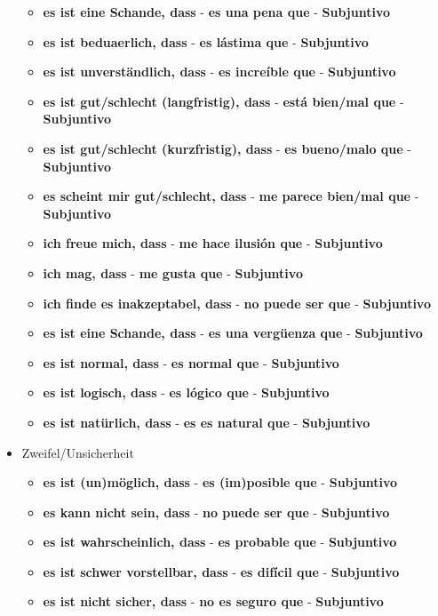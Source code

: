 \documentclass{article}
\begin{document}
\begin{multicols}{2}
\begin{itemize}
		\begin{itemize}
			\item{\textbf{es ist eine Schande, dass} - \textbf{es una pena que} - \textbf{Subjuntivo}}
			\item{\textbf{es ist beduaerlich, dass} - \textbf{es lástima que} - \textbf{Subjuntivo}}
			\item{\textbf{es ist unverständlich, dass} - \textbf{es increíble que} - \textbf{Subjuntivo}}
			\item{\textbf{es ist gut/schlecht (langfristig), dass} - \textbf{está bien/mal que} - \textbf{Subjuntivo}}
			\item{\textbf{es ist gut/schlecht (kurzfristig), dass} - \textbf{es bueno/malo que} - \textbf{Subjuntivo}}
			\item{\textbf{es scheint mir gut/schlecht, dass} - \textbf{me parece bien/mal que} - \textbf{Subjuntivo}}
			\item{\textbf{ich freue mich, dass} - \textbf{me hace ilusión que} - \textbf{Subjuntivo}}
			\item{\textbf{ich mag, dass} - \textbf{me gusta que} - \textbf{Subjuntivo}}
			\item{\textbf{ich finde es inakzeptabel, dass} - \textbf{no puede ser que} - \textbf{Subjuntivo}}
			\item{\textbf{es ist eine Schande, dass} - \textbf{es una vergüenza que} - \textbf{Subjuntivo}}
			\item{\textbf{es ist normal, dass} - \textbf{es normal que} - \textbf{Subjuntivo}}
			\item{\textbf{es ist logisch, dass} - \textbf{es lógico que} - \textbf{Subjuntivo}}
			\item{\textbf{es ist natürlich, dass} - \textbf{es es natural que} - \textbf{Subjuntivo}}
		\end{itemize}
		\item{Zweifel/Unsicherheit}
		\begin{itemize}
			\item{\textbf{es ist (un)möglich, dass} - \textbf{es (im)posible que} - \textbf{Subjuntivo}}
			\item{\textbf{es kann nicht sein, dass} - \textbf{no puede ser que} - \textbf{Subjuntivo}}
			\item{\textbf{es ist wahrscheinlich, dass} - \textbf{es probable que} - \textbf{Subjuntivo}}
			\item{\textbf{es ist schwer vorstellbar, dass} - \textbf{es difícil que} - \textbf{Subjuntivo}}
			\item{\textbf{es ist nicht sicher, dass} - \textbf{no es seguro que} - \textbf{Subjuntivo}}

\end{itemize}
\end{itemize}
\end{multicols}
\end{document}
